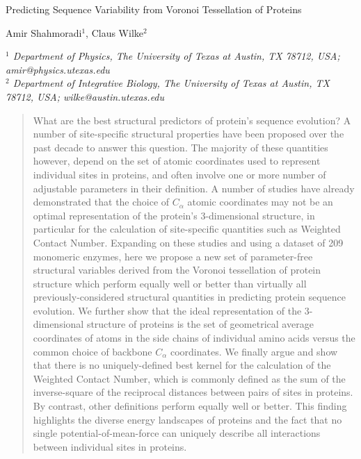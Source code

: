 \documentclass[11pt]{article}
\makeatletter
\newcommand\pubnumber{}
\newcommand\pubdate{\today}
\def\affiliation{$^1$ Department of Physics, The University of Texas at Austin, TX 78712, USA; amir@physics.utexas.edu \\
                 $^2$ Department of Integrative Biology, The University of Texas at Austin, TX 78712, USA; wilke@austin.utexas.edu
                 }
\def\Title#1{\begin{center} {\Large #1 } \end{center}}
\def\Author#1{\begin{center}{ \sc #1} \end{center}}
\def\Address#1{\begin{center}{ \it #1} \end{center}}
\newcommand\pubblock{\rightline{\begin{tabular}{l} \pubnumber\\
         \pubdate  \end{tabular}}}
\newenvironment{Abstract}{\begin{quotation}  }{\end{quotation}}
\makeatother
\begin{document}
\begin{titlepage}
\pubblock

\vfill
\Title{Predicting Sequence Variability from Voronoi Tessellation of Proteins}
\vfill
\Author{Amir Shahmoradi$^{1}$, Claus Wilke$^2$}
\Address{\affiliation}
\vfill
\begin{Abstract}
    What are the best structural predictors of protein's sequence evolution? A number of site-specific structural properties have been proposed over the past decade to answer this question. The majority of these quantities however, depend on the set of atomic coordinates used to represent individual sites in proteins, and often involve one or more number of adjustable parameters in their definition. A number of studies have already demonstrated that the choice of $C_\alpha$ atomic coordinates may not be an optimal representation of the protein's 3-dimensional structure, in particular for the calculation of site-specific quantities such as Weighted Contact Number.  Expanding on these studies and using a dataset of 209 monomeric enzymes, here we propose a new set of parameter-free structural variables derived from the Voronoi tessellation of protein structure which perform equally well or better than virtually all previously-considered structural quantities in predicting protein sequence evolution. We further show that the ideal representation of the 3-dimensional structure of proteins is the set of geometrical average coordinates of atoms in the side chains of individual amino acids versus the common choice of backbone $C_\alpha$ coordinates. We finally argue and show that there is no uniquely-defined best kernel for the calculation of the Weighted Contact Number, which is commonly defined as the sum of the inverse-square of the reciprocal distances between pairs of sites in proteins. By contrast, other definitions perform equally well or better.  This finding highlights the diverse energy landscapes of proteins and the fact that no single potential-of-mean-force can uniquely describe all interactions between individual sites in proteins.

\end{Abstract}
\end{titlepage}
\end{document}
